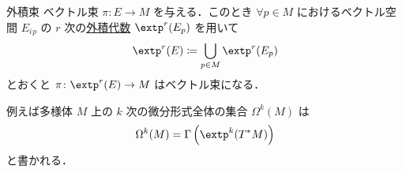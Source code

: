 \documentclass[geometry_main]{subfiles}
\begin{document}
\begin{mydef}[label=def.tensor-bundle]{外積束}
	ベクトル束 $\pi \colon E \to M$ を与える．このとき $\forall p \in M$ におけるベクトル空間 $E_i{}_p$ の $r$ 次の\hyperref[def.ext]{外積代数} $\extp^r(E_p)$ を用いて
	\begin{align}
		\extp^r (E) \coloneqq \bigcup_{p\in M} \extp^r(E_p)
	\end{align}
	とおくと $\pi \colon \extp^r (E) \to M$ はベクトル束になる．
\end{mydef}

例えば\cinfty 多様体 $M$ 上の $k$ 次の微分形式全体の集合 $\Omega^k(M)$ は
\begin{align}
	\Omega^k(M) = \Gamma \left( \extp^k (T^*M) \right) 
\end{align}
と書かれる．
\end{document}
